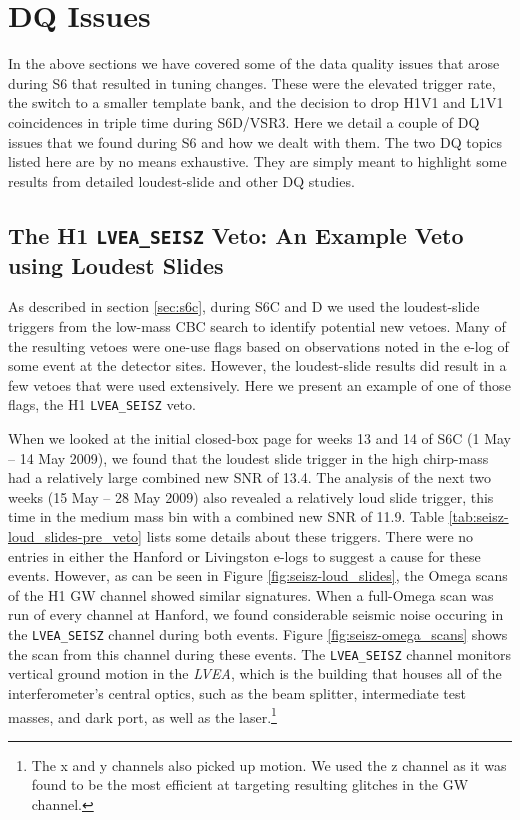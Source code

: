 \section{DQ Issues}

In the above sections we have covered some of the data quality issues that arose during S6 that resulted in tuning changes. These were the elevated trigger rate, the switch to a smaller template bank, and the decision to drop H1V1 and L1V1 coincidences in triple time during S6D/VSR3. Here we detail a couple of \ac{DQ} issues that we found during \ac{S6} and how we dealt with them. The two \ac{DQ} topics listed here are by no means exhaustive. They are simply meant to highlight some results from detailed loudest-slide and other DQ studies.

\subsection{The H1 \texttt{LVEA\_SEISZ} Veto: An Example Veto using Loudest Slides}

As described in section \ref{sec:s6c}, during S6C and D we used the loudest-slide triggers from the low-mass \ac{CBC} search to identify potential new vetoes. Many of the resulting vetoes were one-use flags based on observations noted in the e-log of some event at the detector sites. However, the loudest-slide results did result in a few vetoes that were used extensively. Here we present an example of one of those flags, the H1 \verb|LVEA_SEISZ| veto.

When we looked at the initial closed-box \ihope page for weeks 13 and 14 of S6C (1 May -- 14 May 2009), we found that the loudest slide trigger in the high chirp-mass had a relatively large combined new \ac{SNR} of 13.4. The \ihope analysis of the next two weeks (15 May -- 28 May 2009) also revealed a relatively loud slide trigger, this time in the medium mass bin with a combined new \ac{SNR} of 11.9. Table \ref{tab:seisz-loud_slides-pre_veto} lists some details about these triggers. There were no entries in either the Hanford or Livingston e-logs to suggest a cause for these events. However, as can be seen in Figure \ref{fig:seisz-loud_slides}, the Omega scans of the H1 \ac{GW} channel showed similar signatures. When a full-Omega scan was run of every channel at Hanford, we found considerable seismic noise occuring in the \verb|LVEA_SEISZ| channel during both events. Figure \ref{fig:seisz-omega_scans} shows the scan from this channel during these events. The \verb|LVEA_SEISZ| channel monitors vertical ground motion in the \emph{LVEA}, which is the building that houses all of the interferometer's central optics, such as the beam splitter, intermediate test masses, and dark port, as well as the laser.\footnote{The x and y channels also picked up motion. We used the z channel as it was found to be the most efficient at targeting resulting glitches in the \ac{GW} channel.}

